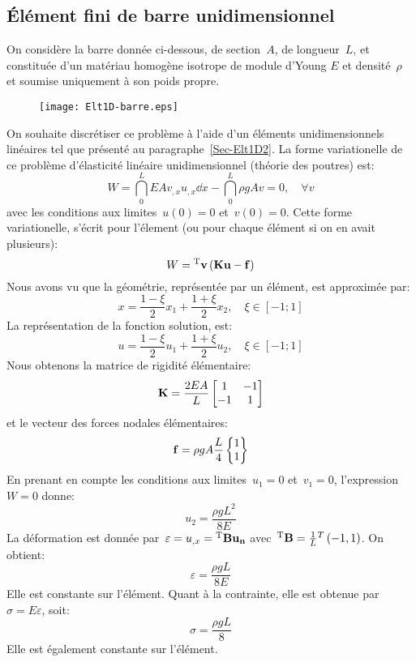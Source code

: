   \subsection{Élément fini de barre unidimensionnel}\label{Sec-barre1D}
\fi
On considère la barre donnée ci-dessous, de section~$A$, de longueur~$L$, et constituée 
d'un matériau homogène isotrope de module d'Young 
$E$ et densité~$\rho$ et soumise uniquement à son poids propre.\\
\begin{figure}[ht]
\centering
\texttt{[image: Elt1D-barre.eps]}
\end{figure}
On souhaite discrétiser ce problème à l'aide d'un éléments unidimensionnels linéaires
tel que présenté au paragraphe~\ref{Sec-Elt1D2}.
\medskipvm
La forme variationelle de ce problème d'élasticité linéaire unidimensionnel (théorie des poutres) est:
\begin{equation}
W=\dint_0^L EA v_{,x}u_{,x} \dd x - \dint_0^L \rho g A v = 0, \quad \forall v
\end{equation}
avec les conditions aux limites~$u(0)=0$ et~$v(0)=0$.
Cette forme variationelle, s'écrit pour l'élement (ou pour chaque élément si on en avait plusieurs):
\begin{equation}
W = \LL{v} \left( \MM{K}\VV{u} - \VV{f} \right)
\end{equation}
\medskipvm
Nous avons vu que la géométrie, représentée par un élément, est approximée par:
\begin{equation} x=\frac{1-\xi}2 x_1 + \frac{1+\xi}2 x_2, \quad \xi\in[-1;1] \end{equation}
La représentation de la fonction solution, est:
\begin{equation} u = \frac{1-\xi}2 u_1 + \frac{1+\xi}2 u_2, \quad \xi\in[-1;1] \end{equation}
\medskipvm
Nous obtenons la matrice de rigidité élémentaire:
\begin{equation} 
\MM{K} = \frac{2EA}L \MM*{1 & -1\\ -1& 1}
\end{equation}
et le vecteur des forces nodales élémentaires:
\begin{equation} 
\VV{f} = \rho g A \frac{L}4 \VV*{1 \\1}
\end{equation}
\medskipvm
En prenant en compte les conditions aux limites~$u_1=0$ et~$v_1=0$, l'expression~$W=0$ donne:
\begin{equation} u_2 = \frac{\rho g L^2}{8 E} \end{equation}
\medskipvm
La déformation est donnée par~$\varepsilon=u_{,x}=\LL{B}\VV{u_n}$ avec~${}^\mathrm{T}\mathbf{B}=\frac1L {}^T\left( -1, 1\right)$.
On obtient:
\begin{equation}
\varepsilon=\frac{\rho g L}{8 E}
\end{equation} 
Elle est constante sur l'élément. Quant à la contrainte, elle est obtenue par~$\sigma=E\varepsilon$, soit:
\begin{equation}\sigma=\frac{\rho g L}8\end{equation} Elle est également constante sur l'élément.
\medskipvm
\ifVersionAvecExemplesSepares
